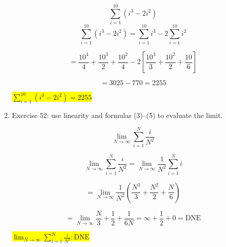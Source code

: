 \documentclass[11pt]{article}
\begin{document}
\begin{enumerate}
\[
    \sum_{i=1}^{10} (i^3 - 2i^2)
\]
\[\sum_{i=1}^{10} (i^3 - 2i^2) = \sum_{i=1}^{10} i^3 - 2\sum_{i=1}^{10} i^2\]

\[=  \frac{10^4}{4} + \frac{10^3}{2} + \frac{10^2}{4} - 2\left[\frac{10^3}{3} + \frac{10^2}{2} + \frac{10}{6}\right]\]

\[= 3025 - 770 = 2255\]

\colorbox{yellow}{$\sum_{i=1}^{10} (i^3 - 2i^2) = 2255$}
\item
Exercise 52: use linearity and formulas (3)–(5) to evaluate the limit.

\[
    \lim_{N\to\infty} \sum_{i=1}^N \frac{i}{N^2}
\]

\[\lim_{N\to\infty} \sum_{i=1}^N \frac{i}{N^2} = \lim_{N\to\infty} \frac{1}{N^2} \sum_{i=1}^N i\]

\[= \lim_{N \to \infty} \frac{1}{N^2} (\frac{N^3}{3} + \frac{N^2}{2} + \frac{N}{6})\]

\[= \lim_{N \to \infty} \frac{N}{3} + \frac{1}{2} + \frac{1}{6N}  = \infty + \frac{1}{2} + 0 = \text{DNE}\]

\colorbox{yellow}{$\lim_{N\to\infty} \sum_{i=1}^N \frac{i}{N^2} : \text{DNE}$}





\end{enumerate}
%

%
\end{document}

